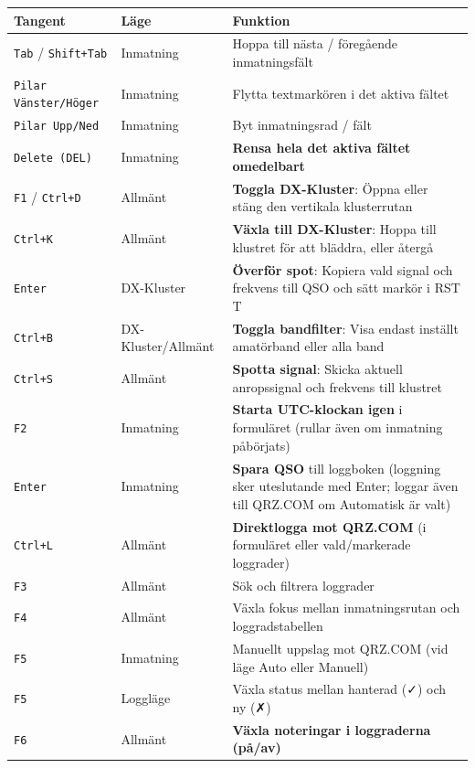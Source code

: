 \documentclass[11pt,a4paper]{article}
\begin{document}
\begin{table}[htbp]
\centering
\small
\begin{tabularx}{\textwidth}{llX}
\toprule
\textbf{Tangent} & \textbf{Läge} & \textbf{Funktion} \\
\midrule
\texttt{Tab} / \texttt{Shift+Tab} & Inmatning & Hoppa till nästa / föregående inmatningsfält \\
\texttt{Pilar Vänster/Höger} & Inmatning & Flytta textmarkören i det aktiva fältet \\
\texttt{Pilar Upp/Ned} & Inmatning & Byt inmatningsrad / fält \\
\texttt{Delete (DEL)} & Inmatning & \textbf{Rensa hela det aktiva fältet omedelbart} \\
\texttt{F1} / \texttt{Ctrl+D} & Allmänt & \textbf{Toggla DX-Kluster}: Öppna eller stäng den vertikala klusterrutan \\
\texttt{Ctrl+K} & Allmänt & \textbf{Växla till DX-Kluster}: Hoppa till klustret för att bläddra, eller återgå \\
\texttt{Enter} & DX-Kluster & \textbf{Överför spot}: Kopiera vald signal och frekvens till QSO och sätt markör i RST T \\
\texttt{Ctrl+B} & DX-Kluster/Allmänt & \textbf{Toggla bandfilter}: Visa endast inställt amatörband eller alla band \\
\texttt{Ctrl+S} & Allmänt & \textbf{Spotta signal}: Skicka aktuell anropssignal och frekvens till klustret \\
\texttt{F2} & Inmatning & \textbf{Starta UTC-klockan igen} i formuläret (rullar även om inmatning påbörjats) \\
\texttt{Enter} & Inmatning & \textbf{Spara QSO} till loggboken (loggning sker uteslutande med Enter; loggar även till QRZ.COM om Automatisk är valt) \\
\texttt{Ctrl+L} & Allmänt & \textbf{Direktlogga mot QRZ.COM} (i formuläret eller vald/markerade loggrader) \\
\texttt{F3} & Allmänt & Sök och filtrera loggrader \\
\texttt{F4} & Allmänt & Växla fokus mellan inmatningsrutan och loggradstabellen \\
\texttt{F5} & Inmatning & Manuellt uppslag mot QRZ.COM (vid läge Auto eller Manuell) \\
\texttt{F5} & Loggläge & Växla status mellan hanterad (✓) och ny (✗) \\
\texttt{F6} & Allmänt & \textbf{Växla noteringar i loggraderna (på/av)} \\

\end{tabularx}
\end{table}
\end{document}

